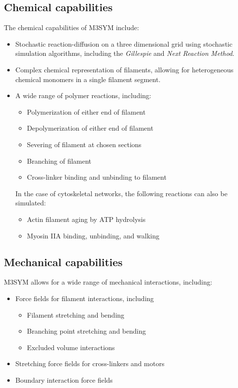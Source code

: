 \documentclass[11pt, oneside]{article}   	%
\begin{document}
\subsection{Chemical capabilities}
 The chemical capabilities of M3SYM include:

\begin{itemize}

\item Stochastic reaction-diffusion on a three dimensional grid using stochastic simulation algorithms, including the \textit{Gillespie} and \textit{Next Reaction Method}.
\item Complex chemical representation of filaments, allowing for heterogeneous chemical monomers in a single filament segment.
\item A wide range of polymer reactions, including:
\begin{itemize}
\item Polymerization of either end of filament
\item Depolymerization of either end of filament
\item Severing of filament at chosen sections
\item Branching of filament
\item Cross-linker binding and unbinding to filament
\end{itemize}

\break
In the case of cytoskeletal networks, the following reactions can also be simulated:
\begin{itemize}
\item Actin filament aging by ATP hydrolysis
\item Myosin IIA binding, unbinding, and walking
\end{itemize}

\end{itemize}

\subsection{Mechanical capabilities}
M3SYM allows for a wide range of mechanical interactions, including:

\begin{itemize}
\item Force fields for filament interactions, including
\begin{itemize}
\item Filament stretching and bending
\item Branching point stretching and bending
\item Excluded volume interactions
\end{itemize}
\item Stretching force fields for cross-linkers and motors 
\item Boundary interaction force fields
\end{itemize}
\end{document}
